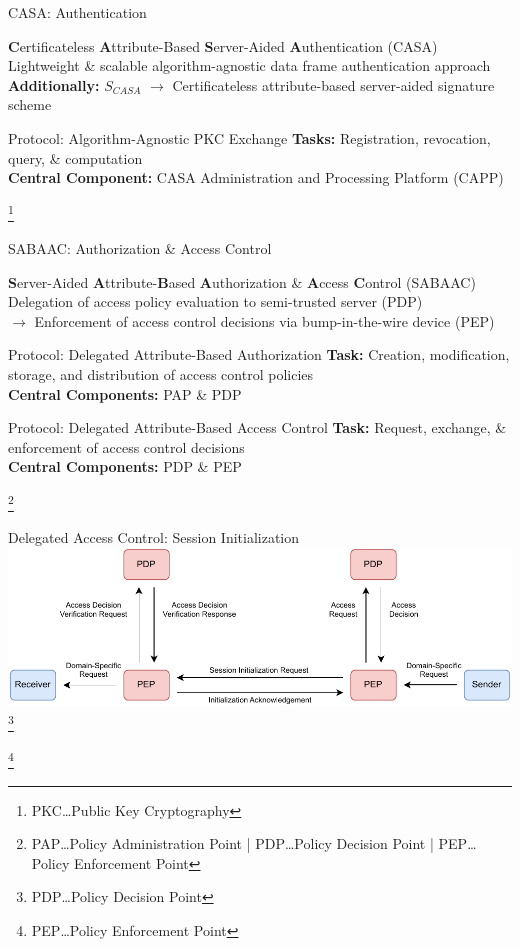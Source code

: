 \documentclass[en]{sdqbeamer}
\newcommand\nonumberfootnote[1]{%
  \begingroup
  \renewcommand\thefootnote{}\footnote{#1}%
  \addtocounter{footnote}{-1}%
  \endgroup
}
\begin{document}
\begin{frame}{CASA: Authentication}
    \begin{greenblock}{\textbf{C}ertificateless \textbf{A}ttribute-Based \textbf{S}erver-Aided \textbf{A}uthentication (CASA)}
        Lightweight \& scalable algorithm-agnostic data frame authentication approach
        \\\textbf{Additionally:} $S_{CASA}$ $\rightarrow$ Certificateless attribute-based server-aided signature scheme
    \end{greenblock}
    \begin{blueblock}{Protocol: Algorithm-Agnostic PKC Exchange}
        \textbf{Tasks:} Registration, revocation, query, \& computation
        \\\textbf{Central Component:} CASA Administration and Processing Platform (CAPP)
    \end{blueblock}
    \nonumberfootnote{PKC\dots Public Key Cryptography}
\end{frame}
\begin{frame}{SABAAC: Authorization \& Access Control}
    \begin{greenblock}{\textbf{S}erver-Aided \textbf{A}ttribute-\textbf{B}ased \textbf{A}uthorization \& \textbf{A}ccess \textbf{C}ontrol (SABAAC)}
        Delegation of access policy evaluation to semi-trusted server (PDP)
        \\$\rightarrow$ Enforcement of access control decisions via bump-in-the-wire device (PEP)
    \end{greenblock}
    \begin{blueblock}{Protocol: Delegated Attribute-Based Authorization}
        \textbf{Task:} Creation, modification, storage, and distribution of access control policies
        \\\textbf{Central Components:} PAP \& PDP
    \end{blueblock}
    \begin{blueblock}{Protocol: Delegated Attribute-Based Access Control}
        \textbf{Task:} Request, exchange, \& enforcement of access control decisions
        \\\textbf{Central Components:} PDP \& PEP
    \end{blueblock}
    \nonumberfootnote{PAP\dots Policy Administration Point | PDP\dots Policy Decision Point | PEP\dots Policy Enforcement Point}
\end{frame}
\begin{frame}{Delegated Access Control: Session Initialization}
    \centering
    \includegraphics[width=1.0\textwidth]{./figures/SABAAC_protocols_accesscontrol_initialization_shortened.drawio.pdf}
    \nonumberfootnote{\color{IndianRed} PDP\dots Policy Decision Point}
    \nonumberfootnote{\color{IndianRed} PEP\dots Policy Enforcement Point}
\end{frame}
\end{document}
